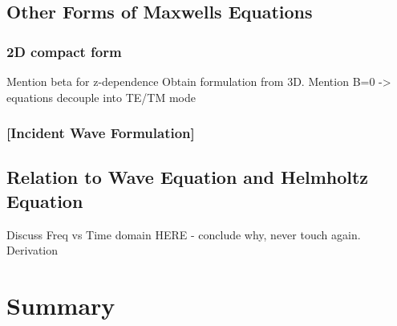 \subsection{Other Forms of Maxwells Equations}
\subsubsection{2D compact form}
Mention beta for z-dependence
Obtain formulation from 3D. Mention B=0 -> equations decouple into TE/TM mode
\subsubsection{[Incident Wave Formulation]}
\subsection{Relation to Wave Equation and Helmholtz Equation}
Discuss Freq vs Time domain HERE - conclude why, never touch again.
Derivation
\section{Summary}